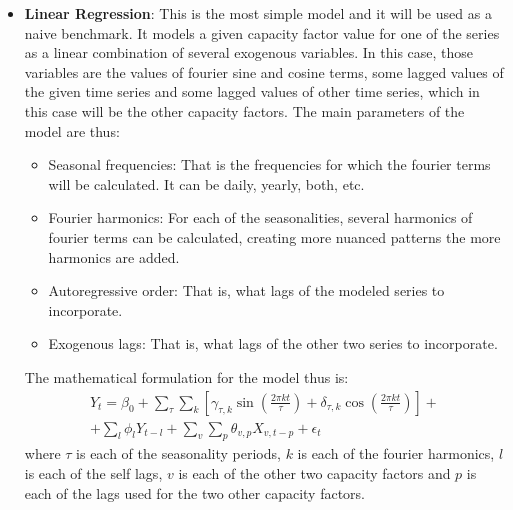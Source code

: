 \begin{itemize}
    \item \textbf{Linear Regression}: This is the most simple model and it will be used as a naive benchmark. It models a given capacity factor value for one of the series as a linear combination of several exogenous variables. In this case, those variables are the values of fourier sine and cosine terms, some lagged values of the given time series and some lagged values of other time series, which in this case will be the other capacity factors. The main parameters of the model are thus:
    \begin{itemize}
        \item Seasonal frequencies: That is the frequencies for which the fourier terms will be calculated. It can be daily, yearly, both, etc.
        \item Fourier harmonics: For each of the seasonalities, several harmonics of fourier terms can be calculated, creating more nuanced patterns the more harmonics are added.
        \item Autoregressive order: That is, what lags of the modeled series to incorporate.
        \item Exogenous lags: That is, what lags of the other two series to incorporate. 
    \end{itemize}
    The mathematical formulation for the model thus is:
    \begin{multline}
        Y_t=\beta_0 + \sum_{\tau}\sum_{k}\left[\gamma_{\tau,k}\sin\left(\frac{2\pi k t}{\tau}\right) + \delta_{\tau,k}\cos\left(\frac{2\pi k t}{\tau}\right)\right] +\\+ \sum_l \phi_l Y_{t-l} + \sum_v\sum_p\theta_{v,p}X_{v,t-p} + \epsilon_t
    \end{multline}
    where $\tau$ is each of the seasonality periods, $k$ is each of the fourier harmonics, $l$ is each of the self lags, $v$ is each of the other two capacity factors and $p$ is each of the lags used for the two other capacity factors.
    

\end{itemize}
